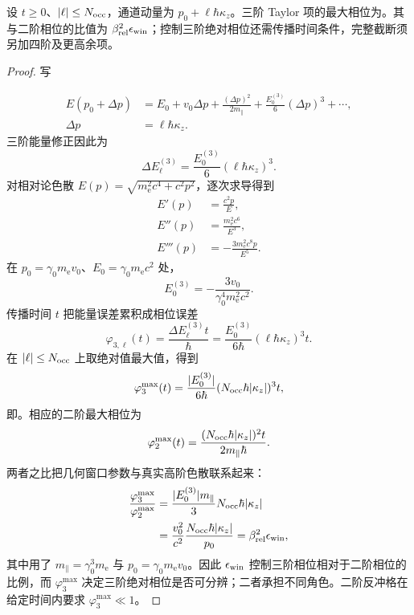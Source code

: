 \begin{proposition}[占据窗内的三阶色散相位]
设 $t\ge0$、$|\ell|\le N_{\rm occ}$，通道动量为 $p_0+\ell\hbar\kappa_z$。三阶 Taylor 项的最大相位为。其与二阶相位的比值为 $\beta_{\rm rel}^2\epsilon_{\rm win}$；控制三阶绝对相位还需传播时间条件，完整截断须另加四阶及更高余项。
\end{proposition}
\begin{proof}
写

\begin{align*}
E(p_0+\Delta p)
&=E_0+v_0\Delta p+\frac{(\Delta p)^2}{2m_\parallel}+\frac{E_0^{(3)}}{6}(\Delta p)^3+\cdots,\\
\Delta p&=\ell\hbar\kappa_z.
\end{align*}
三阶能量修正因此为
\begin{equation*}
\Delta E_\ell^{(3)}=\frac{E_0^{(3)}}{6}(\ell\hbar\kappa_z)^3.
\end{equation*}
对相对论色散 $E(p)=\sqrt{m_{\mathrm e}^2c^4+c^2p^2}$，逐次求导得到
\begin{align*}
E'(p)&=\frac{c^2p}{E},\\
E''(p)&=\frac{m_{\mathrm e}^2c^6}{E^3},\\
E'''(p)&=-\frac{3m_{\mathrm e}^2c^8p}{E^5}.
\end{align*}
在 $p_0=\gamma_0m_{\mathrm e} v_0$、$E_0=\gamma_0m_{\mathrm e} c^2$ 处，
\begin{equation*}
E_0^{(3)}=-\frac{3v_0}{\gamma_0^4m_{\mathrm e}^2c^2}.
\end{equation*}
传播时间 $t$ 把能量误差累积成相位误差
\begin{equation*}
\varphi_{3,\ell}(t)=\frac{\Delta E_\ell^{(3)}t}{\hbar}=\frac{E_0^{(3)}}{6\hbar}(\ell\hbar\kappa_z)^3t.
\end{equation*}
在 $|\ell|\le N_{\rm occ}$ 上取绝对值最大值，得到
\begin{equation*}
\varphi_3^{\max}(t)=\frac{|E_0^{(3)}|}{6\hbar}(N_{\rm occ}\hbar|\kappa_z|)^3t,
\end{equation*}
即。相应的二阶最大相位为
\begin{equation*}
\varphi_2^{\max}(t)
=\frac{(N_{\rm occ}\hbar|\kappa_z|)^2t}{2m_\parallel\hbar}.
\end{equation*}
两者之比把几何窗口参数与真实高阶色散联系起来：
\begin{align*}
\frac{\varphi_3^{\max}}{\varphi_2^{\max}}
&=\frac{|E_0^{(3)}|m_\parallel}{3}
N_{\rm occ}\hbar|\kappa_z|\\
&=\frac{v_0^2}{c^2}
\frac{N_{\rm occ}\hbar|\kappa_z|}{p_0}
=\beta_{\rm rel}^2\epsilon_{\rm win},
\end{align*}
其中用了 $m_\parallel=\gamma_0^3m_{\mathrm e}$ 与 $p_0=\gamma_0m_{\mathrm e} v_0$。因此 $\epsilon_{\rm win}$ 控制三阶相位相对于二阶相位的比例，而 $\varphi_3^{\max}$ 决定三阶绝对相位是否可分辨；二者承担不同角色。二阶反冲格在给定时间内要求 $\varphi_3^{\max}\ll1$。
\end{proof}



